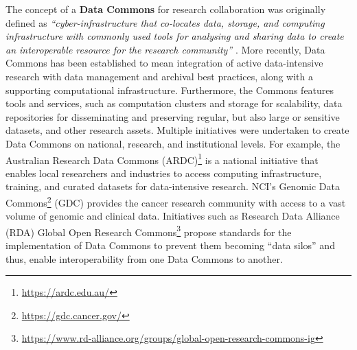 \documentclass[ds,v1.1.2,openaccess]{iosart2x}%
\begin{document}
The concept of a \textbf{Data Commons} for research collaboration was
originally defined as \textit{``cyber-infrastructure that co-locates data,
storage, and computing infrastructure with commonly used tools for
analysing and sharing data to create an interoperable resource for the
research community''} \cite{doi:10.1109/MCSE.2016.92}. More recently, Data
Commons has been established to mean integration of active
data-intensive research with data management and archival best
practices, along with a supporting computational infrastructure.
Furthermore, the Commons features tools and services, such as
computation clusters and storage for scalability, data repositories for
disseminating and preserving regular, but also large or sensitive
datasets, and other research assets. Multiple initiatives were
undertaken to create Data Commons on national, research, and
institutional levels. For example, the Australian Research Data
Commons (ARDC)\footnote{\url{https://ardc.edu.au/}} \cite{doi:10.5334/dsj-2019-044} is a
national initiative that enables local researchers and industries to
access computing infrastructure, training, and curated datasets for
data-intensive research. NCI's Genomic Data
Commons\footnote{\url{https://gdc.cancer.gov/}} (GDC)
\cite{doi:10.1182/blood-2017-03-735654} provides the cancer research
community with access to a vast volume of genomic and clinical data.
Initiatives such as Research Data Alliance (RDA) Global Open Research
Commons\footnote{\url{https://www.rd-alliance.org/groups/global-open-research-commons-ig}}
propose standards for the implementation of Data Commons to prevent
them becoming ``data silos'' and thus, enable interoperability from one
Data Commons to another.
\end{document}
